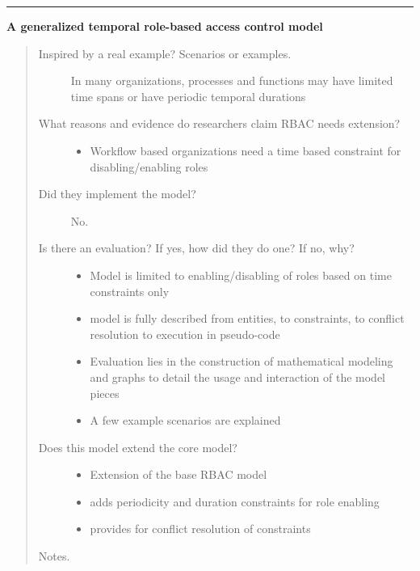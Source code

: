 \documentclass[letterpaper,10pt,english]{sphinxmanual}
\begin{document}
\bigskip\hrule{}\bigskip


\textbf{A generalized temporal role-based access control model}
\begin{quote}
\begin{description}
\item[{Inspired by a real example? Scenarios or examples.}] \leavevmode
In many organizations, processes and functions may have limited time spans or have periodic temporal durations

\item[{What reasons and evidence do researchers claim RBAC needs extension?}] \leavevmode\begin{itemize}
\item {} 
Workflow based organizations need a time based constraint for disabling/enabling roles

\end{itemize}

\item[{Did they implement the model?}] \leavevmode
No.

\item[{Is there an evaluation? If yes, how did they do one? If no, why?}] \leavevmode\begin{itemize}
\item {} 
Model is limited to enabling/disabling of roles based on time constraints only

\item {} 
model is fully described from entities, to constraints, to conflict resolution to execution in pseudo-code

\item {} 
Evaluation lies in the construction of mathematical modeling and graphs to detail the usage and interaction of the model pieces

\item {} 
A few example scenarios are explained

\end{itemize}

\item[{Does this model extend the core model?}] \leavevmode\begin{itemize}
\item {} 
Extension of the base RBAC model

\item {} 
adds periodicity and duration constraints for role enabling

\item {} 
provides for conflict resolution of constraints

\end{itemize}

\end{description}

Notes.
\end{quote}
\end{document}
